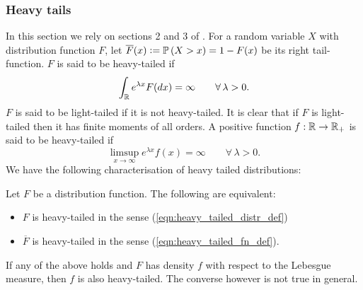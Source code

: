 
\subsubsection{Heavy tails}
In this section we rely on sections 2 and 3 of \cite{foss2011introduction}. For a random variable $X$ with distribution function $F$, let $\overline{F}(x) \vcentcolon= \mathbb{P} \left( X > x \right) = 1 - F(x)$ be its right tail-function. $F$ is said to be heavy-tailed if 
\begin{equation}\label{eqn:heavy_tailed_distr_def}
\int_{\mathbb{R}} e^{\lambda x} F(dx) = \infty\qquad\forall\, \lambda > 0. 
\end{equation}
$F$ is said to be light-tailed if it is not heavy-tailed. It is clear that if $F$ is light-tailed then it has finite moments of all orders. A positive function $f : \mathbb{R} \to \mathbb{R}_+$ is said to be heavy-tailed if 
\begin{equation}\label{eqn:heavy_tailed_fn_def}
\limsup\limits_{x \to \infty} e^{\lambda x} f(x) = \infty\qquad\forall\,\lambda > 0. 
\end{equation}
We have the following characterisation of heavy tailed distributions:

\begin{theorem}
Let $F$ be a distribution function. The following are equivalent:
\begin{itemize}
\item $F$ is heavy-tailed in the sense (\ref{eqn:heavy_tailed_distr_def})
\item $\overline{F}$ is heavy-tailed in the sense (\ref{eqn:heavy_tailed_fn_def}). 
\end{itemize}
If any of the above holds and $F$ has density $f$ with respect to the Lebesgue measure, then $f$ is also heavy-tailed. The converse however is not true in general. 
\end{theorem}

